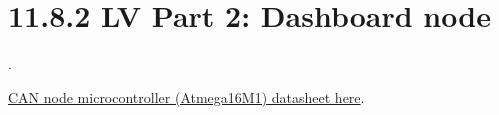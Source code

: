 \documentclass{article}
\begin{document}
\section*{11.8.2 LV Part 2: Dashboard node}.

\href{http://www.atmel.com/images/8209s.pdf}{CAN node microcontroller (Atmega16M1) datasheet here}.

\end{document}

